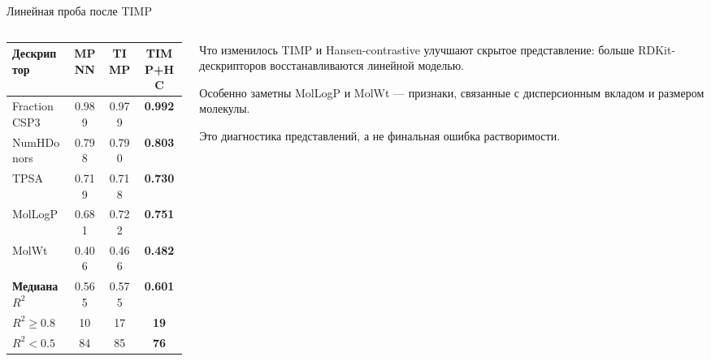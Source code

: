\documentclass[aspectratio=169,10pt]{beamer}
\newcommand{\smallnote}[1]{{\scriptsize\color{TGSlate}#1}}
\begin{document}
\begin{frame}{Линейная проба после TIMP}
  \small
  \begin{columns}[T,onlytextwidth]
    \begin{column}{0.54\textwidth}
      \centering
      \scriptsize
      \setlength{\tabcolsep}{3pt}
      \begin{tabular}{lccc}
        \toprule
        \textbf{Дескриптор} & \textbf{MPNN} & \textbf{TIMP} & \textbf{TIMP+HC}\\
        \midrule
        FractionCSP3 & 0.989 & 0.979 & \textbf{0.992}\\
        NumHDonors & 0.798 & 0.790 & \textbf{0.803}\\
        TPSA & 0.719 & 0.718 & \textbf{0.730}\\
        MolLogP & 0.681 & 0.722 & \textbf{0.751}\\
        MolWt & 0.406 & 0.466 & \textbf{0.482}\\
        \midrule
        \textbf{Медиана $R^2$} & 0.565 & 0.575 & \textbf{0.601}\\
        $R^2 \ge 0.8$ & 10 & 17 & \textbf{19}\\
        $R^2 < 0.5$ & 84 & 85 & \textbf{76}\\
        \bottomrule
      \end{tabular}
    \end{column}
    \begin{column}{0.42\textwidth}
      \begin{block}{Что изменилось}
        \scriptsize
        TIMP и Hansen-contrastive улучшают скрытое представление:
        больше RDKit-дескрипторов восстанавливаются линейной моделью.

        \vspace{0.35em}
        Особенно заметны MolLogP и MolWt — признаки, связанные с
        дисперсионным вкладом и размером молекулы.
      \end{block}
      \smallnote{Это диагностика представлений, а не финальная ошибка растворимости.}
    \end{column}
  \end{columns}
\end{frame}
\end{document}
